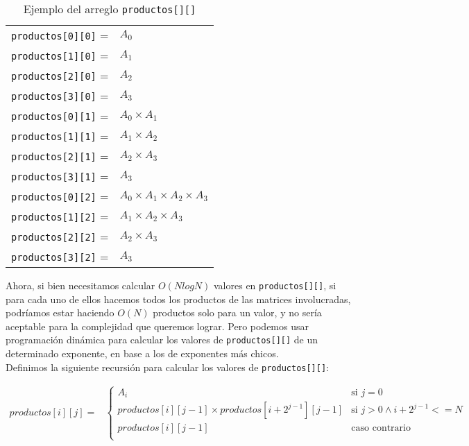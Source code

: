 \begin{table}[h!]
\begin{center}
\begin{tabular}{l l}
\texttt{productos[0][0]} = &$A_0$\\
\texttt{productos[1][0]} = &$A_1$\\
\texttt{productos[2][0]} = &$A_2$\\
\texttt{productos[3][0]} = &$A_3$\\
\texttt{productos[0][1]} = &$A_0 \times A_1$\\
\texttt{productos[1][1]} = &$A_1 \times A_2$\\
\texttt{productos[2][1]} = &$A_2 \times A_3$\\
\texttt{productos[3][1]} = &$A_3$\\
\texttt{productos[0][2]} = &$A_0 \times A_1 \times A_2 \times A_3$\\
\texttt{productos[1][2]} = &$A_1 \times A_2 \times A_3$\\
\texttt{productos[2][2]} = &$A_2 \times A_3$\\
\texttt{productos[3][2]} = &$A_3$
\end{tabular}
\end{center}
\caption{Ejemplo del arreglo \texttt{productos[][]}}
\end{table}

Ahora, si bien necesitamos calcular $O(N log N)$ valores en \texttt{productos[][]}, 
si para cada uno de ellos hacemos todos los productos de las matrices involucradas, 
podríamos estar haciendo $O(N)$ productos solo para un valor, y no sería aceptable 
para la complejidad que queremos lograr. Pero podemos usar programación dinámica para 
calcular los valores de \texttt{productos[][]} de un determinado exponente, en base 
a los de exponentes más chicos.\\

Definimos la siguiente recursión para calcular los valores de \texttt{productos[][]}: 

\begin{align*}
productos[i][j] =
	&\begin{cases}
		A_i & \text{si $j=0$} \\
		productos[i][j-1] \times productos[i+2^{j-1}][j-1] & \text{si $j>0 \wedge i+2^{j-1}<=N$} \\
		productos[i][j-1] & \text{caso contrario} \\
	\end{cases} \\
\end{align*}

